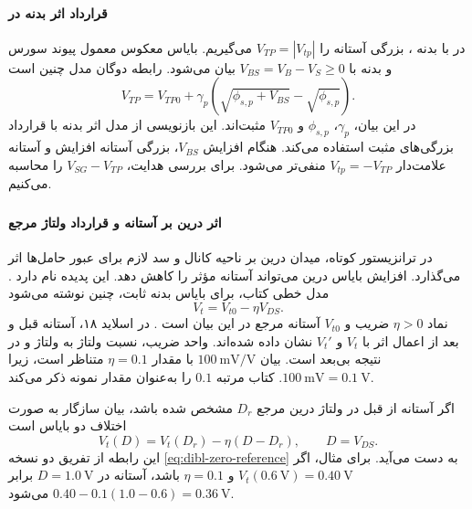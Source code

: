 \paragraph*{قرارداد اثر بدنه در }
در  با بدنه ، بزرگی آستانه را
\(V_{TP}=|V_{tp}|\) می‌گیریم. بایاس معکوس معمول پیوند سورس و بدنه
با \(V_{BS}=V_B-V_S\ge0\) بیان می‌شود. رابطه دوگان مدل چنین است
\begin{equation}
 V_{TP}=V_{TP0}+\gamma_p
 \left(\sqrt{\phi_{s,p}+V_{BS}}-\sqrt{\phi_{s,p}}\right).
 \label{eq:body-pmos-magnitude}
\end{equation}
در این بیان، \(\gamma_p\)، \(\phi_{s,p}\) و \(V_{TP0}\) مثبت‌اند.
این بازنویسی از مدل اثر بدنه با قرارداد بزرگی‌های مثبت استفاده می‌کند.
هنگام افزایش \(V_{BS}\)، بزرگی آستانه افزایش و آستانه علامت‌دار
\(V_{tp}=-V_{TP}\) منفی‌تر می‌شود. برای بررسی هدایت،
\(V_{SG}-V_{TP}\) را محاسبه می‌کنیم.

\subsubsection{}
\label{sec:dibl-effect}
\paragraph*{اثر درین بر آستانه و قرارداد ولتاژ مرجع}
در ترانزیستور کوتاه، میدان درین بر ناحیه کانال و سد لازم برای عبور
حامل‌ها اثر می‌گذارد. افزایش بایاس درین می‌تواند آستانه مؤثر را کاهش
دهد. این پدیده  نام دارد
\cite[بخش ]{weste}\cite[اسلایدهای ۱۸ و ۱۹]{nonideal}.
مدل خطی کتاب، برای بایاس بدنه ثابت، چنین نوشته می‌شود
\begin{equation}
 V_t=V_{t0}-\eta V_{DS}.
 \label{eq:dibl-zero-reference}
\end{equation}
نماد \(\eta>0\) ضریب  و \(V_{t0}\) آستانه مرجع در این
بیان است \cite[رابطه ]{weste}. در اسلاید ۱۸، آستانه قبل
و بعد از اعمال اثر با \(V_t\) و \(V_t'\) نشان داده شده‌اند.
واحد ضریب، نسبت ولتاژ به ولتاژ و در نتیجه بی‌بعد است.
بیان \(\qty{100}{\milli\volt\per\volt}\) با مقدار \(\eta=0.1\)
متناظر است، زیرا \(\qty{100}{\milli\volt}=\qty{0.1}{\volt}\).
کتاب مرتبه \(0.1\) را به‌عنوان مقدار نمونه ذکر می‌کند.

اگر آستانه از قبل در ولتاژ درین مرجع \(D_r\) مشخص شده باشد، بیان
سازگار به صورت اختلاف دو بایاس است
\begin{equation}
 V_t(D)=V_t(D_r)-\eta(D-D_r),\qquad D=V_{DS}.
 \label{eq:dibl-anchored-reference}
\end{equation}
این رابطه از تفریق دو نسخه \eqref{eq:dibl-zero-reference} به دست
می‌آید. برای مثال، اگر \(V_t(\qty{0.6}{\volt})=\qty{0.40}{\volt}\)
و \(\eta=0.1\) باشد، آستانه در \(D=\qty{1.0}{\volt}\) برابر
\(0.40-0.1(1.0-0.6)=\qty{0.36}{\volt}\) می‌شود.

